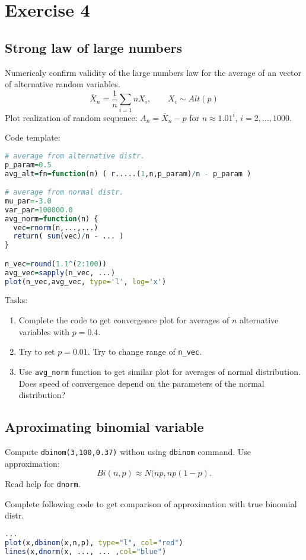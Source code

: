 \documentclass[4pt]{article}
\def\close#1{\overline{#1}}
\begin{document}
\pagebreak

\section{Exercise 4}

\subsection{Strong law of large numbers}
Numericaly confirm validity of the large numbers law for the average of an vector of alternative random variables.
\[
   \close{X}_n = \frac{1}{n} \sum_{i=1}{n} X_i, \qquad X_i \sim Alt(p)
\]
Plot realization of random sequence: $A_n = \close{X}_n - p$ for $n\approx 1.01^i$, $i=2,\dots,1000$.

Code template:
\begin{lstlisting}[language=r]
# average from alternative distr.
p_param=0.5
avg_alt=fn=function(n) ( r.....(1,n,p_param)/n - p_param )

# average from normal distr.
mu_par=-3.0
var_par=100000.0
avg_norm=function(n) {
  vec=rnorm(n,...,...)
  return( sum(vec)/n - ... )
} 

n_vec=round(1.1^(2:100))
avg_vec=sapply(n_vec, ...)
plot(n_vec,avg_vec, type='l', log='x')
\end{lstlisting}

Tasks:
\begin{enumerate}
 \item Complete the code to get convergence plot for averages of $n$ alternative variables with $p=0.4$.
 \item Try to set $p=0.01$. Try to change range of \verb'n_vec'.
 \item Use \verb'avg_norm' function to get similar plot for averages of normal distribution. Does speed of convergence depend on the parameters of the normal distribution?
\end{enumerate}

\subsection{Aproximating binomial variable}
Compute \verb'dbinom(3,100,0.37)' withou using \verb'dbinom' command. Use approximation:
\[
   Bi(n,p) \approx N(np,np(1-p).
\]
Read help for \verb'dnorm'.

Complete following code to get comparison of approximation with true binomial distr.
\begin{lstlisting}[language=r]
...
plot(x,dbinom(x,n,p), type="l", col="red")
lines(x,dnorm(x, ..., ... ,col="blue")
\end{lstlisting}
\end{document}

